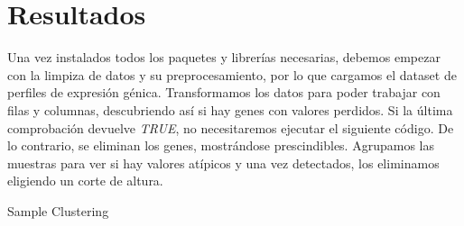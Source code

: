 
\section{Resultados}

Una vez instalados todos los paquetes y librerías necesarias, debemos empezar con la limpiza de datos y su preprocesamiento, por lo que cargamos el dataset de perfiles de expresión génica. Transformamos los datos para poder trabajar con filas y columnas, descubriendo así si hay genes con valores perdidos. Si la última comprobación devuelve \textit{TRUE}, no necesitaremos ejecutar el siguiente código. De lo contrario, se eliminan los genes, mostrándose prescindibles. Agrupamos las muestras para ver si hay valores atípicos y una vez detectados, los eliminamos eligiendo un corte de altura. 


\caption{Sample Clustering}
\label{fig:sample_clustering}
